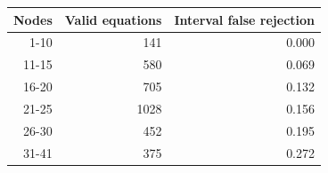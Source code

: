 \begin{tabular}{rrr}
\hline
Nodes & Valid equations & Interval false rejection \\
\hline
1-10 & 141 & 0.000 \\
11-15 & 580 & 0.069 \\
16-20 & 705 & 0.132 \\
21-25 & 1028 & 0.156 \\
26-30 & 452 & 0.195 \\
31-41 & 375 & 0.272 \\
\hline
\end{tabular}
